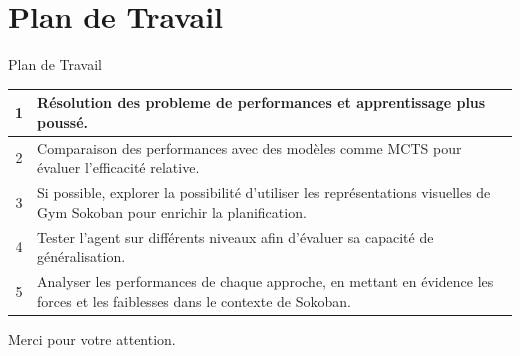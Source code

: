 \documentclass[
	11pt, %
]{beamer}
\begin{document}
\section{Plan de Travail}

\begin{frame}{Plan de Travail}
    \begin{table}
        \centering
		\small
        \begin{tabular}{|c|p{8cm}|}
			\hline
            1 & Résolution des probleme de performances et apprentissage plus poussé. \\
            \hline
            2 & Comparaison des performances avec des modèles comme MCTS pour évaluer l'efficacité relative. \\
            \hline
            3 & Si possible, explorer la possibilité d'utiliser les représentations visuelles de Gym Sokoban pour enrichir la planification. \\
            \hline
            4 & Tester l'agent sur différents niveaux afin d'évaluer sa capacité de généralisation. \\
            \hline
            5 & Analyser les performances de chaque approche, en mettant en évidence les forces et les faiblesses dans le contexte de Sokoban. \\
            \hline
        \end{tabular}
    \end{table}
\end{frame}


\begin{frame}[plain] %
	\begin{center}
		{\Huge Merci pour votre attention.}

	\end{center}
\end{frame}
\end{document}
